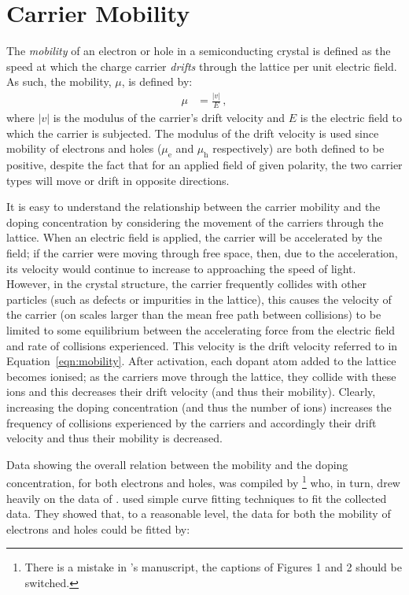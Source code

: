 \section{Carrier Mobility}\label{sec:material-mobility}
The \textit{mobility} of an electron or hole in a semiconducting crystal is defined as the speed at which the charge carrier \textit{drifts} through the lattice per unit electric field. As such, the mobility, $\mu$, is defined by:
\begin{align}
\mu &= \frac{\left|v\right|}{E}\,, \label{eqn:mobility}
\end{align} 
where $\left|v\right|$ is the modulus of the carrier's drift velocity and $E$ is the electric field to which the carrier is subjected. The modulus of the drift velocity is used since mobility of electrons and holes ($\mu_{\mathrm{e}}$ and $\mu_{\mathrm{h}}$ respectively) are both defined to be positive, despite the fact that for an applied field of given polarity, the two carrier types will move or drift in opposite directions.
\par 
It is easy to understand the relationship between the carrier mobility and the doping concentration by considering the movement of the carriers through the lattice. When an electric field is applied, the carrier will be accelerated by the field; if the carrier were moving through free space, then, due to the acceleration, its velocity would continue to increase to approaching the speed of light. However, in the crystal structure, the carrier frequently collides with other particles (such as defects or impurities in the lattice), this causes the velocity of the carrier (on scales larger than the mean free path between collisions) to be limited to some equilibrium between the accelerating force from the electric field and rate of collisions experienced. This velocity is the drift velocity referred to in Equation~\ref{eqn:mobility}. After activation, each dopant atom added to the lattice becomes ionised; as the carriers move through the lattice, they collide with these ions and this decreases their drift velocity (and thus their mobility). Clearly, increasing the doping concentration (and thus the number of ions) increases the frequency of collisions experienced by the carriers and accordingly their drift velocity and thus their mobility is decreased.
\par 
Data showing the overall relation between the mobility and the doping concentration, for both electrons and holes, was compiled by \textcite{Caughey1967}\footnote{There is a mistake in \citeauthor{Caughey1967}'s manuscript, the captions of Figures 1 and 2 should be switched.} who, in turn, drew heavily on the data of \textcite{Irvin1962}. \citeauthor{Caughey1967} used simple curve fitting techniques to fit the collected data. They showed that, to a reasonable level, the data for both the mobility of electrons and holes could be fitted by:
